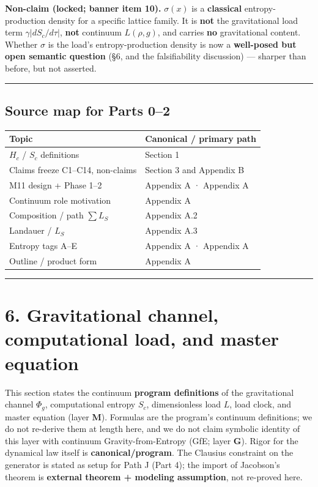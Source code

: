 \documentclass[
  11pt,
]{article}
\newcounter{none} %
\begin{document}
\textbf{Non-claim (locked; banner item 10).} \(\sigma(x)\) is a
\textbf{classical} entropy-production density for a specific lattice
family. It is \textbf{not} the gravitational load term
\(\gamma\lvert dS_c/d\tau\rvert\), \textbf{not} continuum \(L(\rho,g)\),
and carries \textbf{no} gravitational content. Whether \(\sigma\) is the
load's entropy-production density is now a \textbf{well-posed but open
semantic question} (§6, and the falsifiability discussion) --- sharper
than before, but not asserted.

\begin{center}\rule{0.5\linewidth}{0.5pt}\end{center}

\subsection{Source map for Parts 0--2}\label{source-map-for-parts-02}

{\def\LTcaptype{none} %
\begin{longtable}[]{@{}ll@{}}
\toprule\noalign{}
Topic & Canonical / primary path \\
\midrule\noalign{}
\endhead
\bottomrule\noalign{}
\endlastfoot
\(H_c\) / \(S_c\) definitions & Section 1 \\
Claims freeze C1--C14, non-claims & Section 3 and Appendix B \\
M11 design + Phase 1--2 & Appendix A · Appendix A \\
Continuum role motivation & Appendix A \\
Composition / path \(\sum L_S\) & Appendix A.2 \\
Landauer / \(L_S\) & Appendix A.3 \\
Entropy tags A--E & Appendix A · Appendix A \\
Outline / product form & Appendix A \\
\end{longtable}
}

\begin{center}\rule{0.5\linewidth}{0.5pt}\end{center}

\section{6. Gravitational channel, computational load, and master
equation}\label{gravitational-channel-computational-load-and-master-equation}

This section states the continuum \textbf{program definitions} of the
gravitational channel \(\Phi_g\), computational entropy \(S_c\),
dimensionless load \(L\), load clock, and master equation (layer
\textbf{M}). Formulas are the program's continuum definitions; we do not
re-derive them at length here, and we do not claim symbolic identity of
this layer with continuum Gravity-from-Entropy (GfE; layer \textbf{G}).
Rigor for the dynamical law itself is \textbf{canonical/program}. The
Clausius constraint on the generator is stated as setup for Path J (Part
4); the import of Jacobson's theorem is \textbf{external theorem +
modeling assumption}, not re-proved here.
\end{document}

